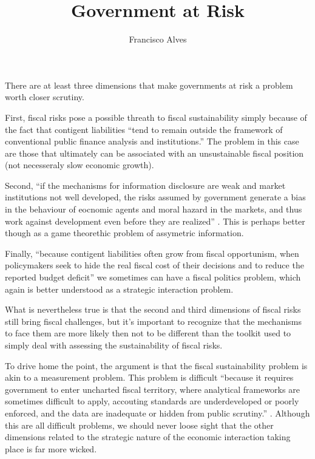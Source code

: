 \documentclass[12pt]{article}
\author{Francisco Alves}
\title{Government at Risk}
\begin{document}
\maketitle


There are at least three dimensions that make governments at risk a problem worth closer scrutiny. 

First, fiscal risks pose a possible threath to fiscal sustainability simply because of the fact that contigent liabilities ``tend to remain outside the framework of conventional public finance analysis and institutions.'' \citep[p. 1]{brixi2002} The problem in this case are those that ultimately can be associated with an unsustainable fiscal position (not necesseraly slow economic growth).

Second, ``if the mechanisms for information disclosure are weak and market institutions not well developed, the risks assumed by government generate a bias in the behaviour of eocnomic agents and moral hazard in the markets, and thus work against development even before they are realized'' \citep[p. 2]{brixi2002}. This is perhaps better though as a game theorethic problem of assymetric information.

Finally, ``because contigent liabilities often grow from fiscal opportunism, when policymakers seek to hide the real fiscal cost of their decisions and to reduce the reported budget deficit''  \citep[p. 2]{brixi2002} we sometimes can have a fiscal politics problem, which again is better understood as a strategic interaction problem.

What is nevertheless true is that the second and third dimensions of fiscal risks still bring fiscal challenges, but it's important to recognize that the mechanisms to face them are more likely then not to be different than the toolkit used to simply deal with assessing the sustainability of fiscal risks.

To drive home the point, the argument is that the fiscal sustainability problem is akin to a measurement problem. This problem is difficult ``because it requires government to enter uncharted fiscal territory, where analytical frameworks are sometimes difficult to apply, accouting standards are underdeveloped or poorly enforced, and the data are inadequate or hidden from public scrutiny.'' \citep[p. 2]{brixi2002}. Although this are all difficult problems, we should never loose sight that the other dimensions related to the strategic nature of the economic interaction taking place is far more wicked.




{\footnotesize
}
\end{document}
